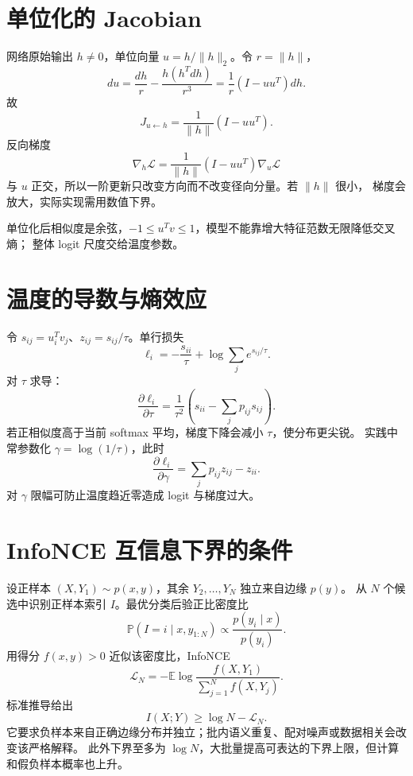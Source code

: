\documentclass[11pt]{article}
\numberwithin{equation}{section}
\newcommand{\E}{\mathbb{E}}
\newcommand{\Pp}{\mathbb{P}}
\newcommand{\1}{\mathbf{1}}
\newcommand{\cL}{\mathcal{L}}
\begin{document}
\section{单位化的 Jacobian}

网络原始输出 $h\ne0$，单位向量 $u=h/\|h\|_2$。令 $r=\|h\|$，
\begin{equation}
 du=\frac{dh}{r}-\frac{h(h^Tdh)}{r^3}
 =\frac1r(I-uu^T)dh.
\end{equation}
故
\begin{equation}
 \boxed{J_{u\leftarrow h}=\frac1{\|h\|}(I-uu^T).}
\end{equation}
反向梯度
\begin{equation}
 \nabla_h\cL=\frac1{\|h\|}(I-uu^T)\nabla_u\cL
\end{equation}
与 $u$ 正交，所以一阶更新只改变方向而不改变径向分量。若 $\|h\|$ 很小，
梯度会放大，实际实现需用数值下界。

单位化后相似度是余弦，$-1\le u^Tv\le1$，模型不能靠增大特征范数无限降低交叉熵；
整体 logit 尺度交给温度参数。

\section{温度的导数与熵效应}

令 $s_{ij}=u_i^Tv_j$、$z_{ij}=s_{ij}/\tau$。单行损失
\begin{equation}
 \ell_i=-\frac{s_{ii}}\tau+\log\sum_j e^{s_{ij}/\tau}.
\end{equation}
对 $\tau$ 求导：
\begin{equation}
 \frac{\partial\ell_i}{\partial\tau}
 =\frac1{\tau^2}\left(s_{ii}-\sum_jp_{ij}s_{ij}\right).
\end{equation}
若正相似度高于当前 softmax 平均，梯度下降会减小 $\tau$，使分布更尖锐。
实践中常参数化 $\gamma=\log(1/\tau)$，此时
\begin{equation}
 \frac{\partial\ell_i}{\partial\gamma}
 =\sum_jp_{ij}z_{ij}-z_{ii}.
\end{equation}
对 $\gamma$ 限幅可防止温度趋近零造成 logit 与梯度过大。

\section{InfoNCE 互信息下界的条件}

设正样本 $(X,Y_1)\sim p(x,y)$，其余 $Y_2,\ldots,Y_N$ 独立来自边缘 $p(y)$。
从 $N$ 个候选中识别正样本索引 $I$。最优分类后验正比密度比
\begin{equation}
 \Pp(I=i\mid x,y_{1:N})
 \propto\frac{p(y_i\mid x)}{p(y_i)}.
\end{equation}
用得分 $f(x,y)>0$ 近似该密度比，InfoNCE
\begin{equation}
 \cL_N=-\E\log\frac{f(X,Y_1)}{\sum_{j=1}^{N}f(X,Y_j)}.
\end{equation}
标准推导给出
\begin{equation}
 \boxed{I(X;Y)\ge\log N-\cL_N.}
\end{equation}
它要求负样本来自正确边缘分布并独立；批内语义重复、配对噪声或数据相关会改变该严格解释。
此外下界至多为 $\log N$，大批量提高可表达的下界上限，但计算和假负样本概率也上升。
\end{document}
